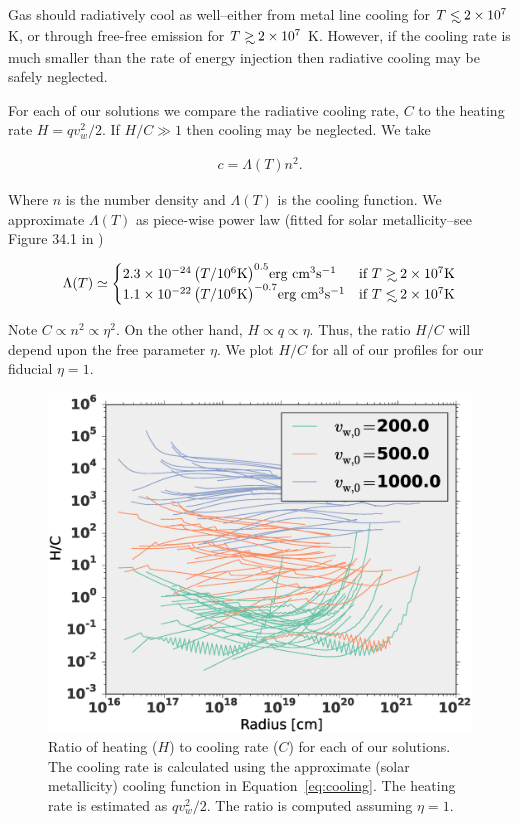 \documentclass[usenatbib,fleqn]{mn2e}
\newcommand\lsim{\mathrel{\rlap{\lower4pt\hbox{\hskip1pt$\sim$}}
        \raise1pt\hbox{$<$}}}
\newcommand\gsim{\mathrel{\rlap{\lower4pt\hbox{\hskip1pt$\sim$}}
        \raise1pt\hbox{$>$}}}
\newcommand{\vw}{v_w}
\begin{document}
Gas should radiatively cool as well--either from metal line cooling
for $T\lsim 2\times 10^7$ K, or through free-free emission for $T\gsim
2\times 10^7$ K.  However, if the cooling rate is much smaller than
the rate of energy injection then radiative cooling may be safely
neglected.

For each of our solutions we compare the radiative cooling rate, $C$
to the heating rate $H=q \vw^2/2$. If $H/C \gg 1$ then cooling may be
neglected. We take

\begin{align}
c=\Lambda(T) n^2.
\end{align}

Where $n$ is the number density and $\Lambda(T)$ is the cooling
function. We approximate $\Lambda(T)$ as piece-wise power law (fitted
for solar metallicity--see Figure 34.1 in \cite{Draine:2011a})

\begin{align}
\Lambda(T)\simeq
\begin{cases}
    2.3 \times 10^{-24} \left(T/10^6 \text{K}\right)^{0.5} $erg cm$^3 $s$^{-1}& \text{if } T \gsim 2 \times 10^7 \text{K} \\
    1.1 \times 10^{-22} \left(T/10^6 \text{K}\right)^{-0.7}  $erg cm$^3 $s$^{-1}& \text{if } T \lsim 2 \times 10^7 \text{K}     
\end{cases}
\label{eq:cooling}
\end{align}

Note $C\propto n^2\propto \eta^2$. On the other hand, $H \propto q
\propto \eta$. Thus, the ratio $H/C$ will depend upon the free
parameter $\eta$. We plot $H/C$ for all of our profiles for our
fiducial $\eta=1$.

\begin{figure}
\includegraphics[width=\columnwidth]{cooling.eps}
\caption{\label{fig:cooling} Ratio of heating ($H$) to cooling rate ($C$) for each of our solutions. The cooling rate is calculated using the approximate (solar metallicity) cooling function in Equation~\ref{eq:cooling}. The heating rate is estimated as $q \vw^2/2$. The ratio is computed assuming $\eta=1$.}
\end{figure}
\end{document}
